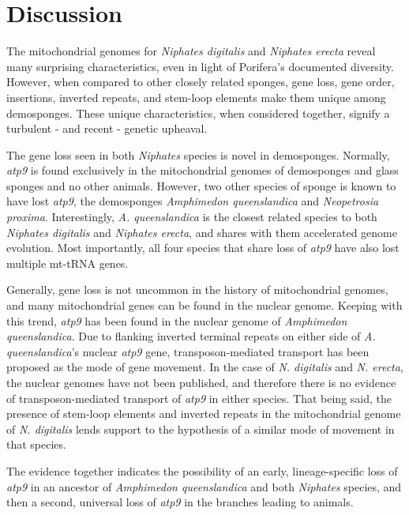 \documentclass[../main.tex]{subfiles}
\begin{document}
\section{Discussion}

The mitochondrial genomes for \emph{Niphates digitalis} and \emph{Niphates erecta} reveal many surprising characteristics, even in light of Porifera's documented diversity. However, when compared to other closely related sponges, gene loss, gene order, insertions, inverted repeats, and stem-loop elements make them unique among demosponges. These unique characteristics, when considered together, signify a turbulent - and recent - genetic upheaval. 

The gene loss seen in both \emph{Niphates} species is novel in demosponges. Normally, \emph{atp9} is found exclusively in the mitochondrial genomes of demosponges and glass sponges and no other animals. However, two other species of sponge is known to have lost \emph{atp9}, the demosponges \emph{Amphimedon queenslandica} and \emph{Neopetrosia proxima}. Interestingly, \emph{A. queenslandica} is the closest related species to both \emph{Niphates digitalis} and \emph{Niphates erecta}, and shares with them accelerated genome evolution. Most importantly, all four species that share loss of \emph{atp9} have also lost multiple mt-tRNA genes.

Generally, gene loss is not uncommon in the history of mitochondrial genomes, and many mitochondrial genes can be found in the nuclear genome. Keeping with this trend, \emph{atp9} has been found in the nuclear genome of \emph{Amphimedon queenslandica}. Due to flanking inverted terminal repeats on either side of \emph{A. queenslandica}'s nuclear \emph{atp9} gene, transposon-mediated transport has been proposed as the mode of gene movement. In the case of \emph{N. digitalis} and \emph{N. erecta}, the nuclear genomes have not been published, and therefore there is no evidence of transposon-mediated transport of \emph{atp9} in either species. That being said, the presence of stem-loop elements and inverted repeats in the mitochondrial genome of \emph{N. digitalis} lends support to the hypothesis of a similar mode of movement in that species. 

The evidence together indicates the possibility of an early, lineage-specific loss of \emph{atp9} in an ancestor of \emph{Amphimedon queenslandica} and both \emph{Niphates} species, and then a second, universal loss of \emph{atp9} in the branches leading to animals. 
\end{document}
